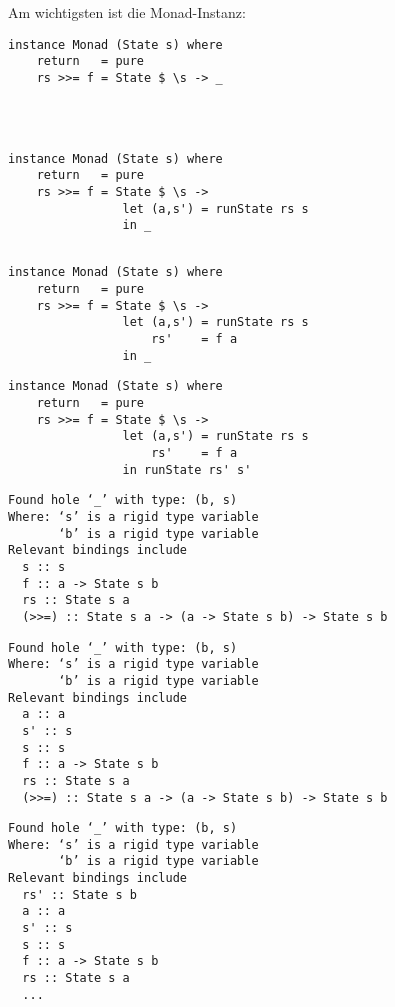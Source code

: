 \documentclass{beamer}
\begin{document}
\begin{frame}[fragile]
Am wichtigsten ist die Monad-Instanz:
\begin{overprint}
\begin{verbatim}
instance Monad (State s) where
    return   = pure
    rs >>= f = State $ \s -> _

    
    
\end{verbatim}
\begin{verbatim}
instance Monad (State s) where
    return   = pure
    rs >>= f = State $ \s ->
                let (a,s') = runState rs s
                in _
    
\end{verbatim}
\begin{verbatim}
instance Monad (State s) where
    return   = pure
    rs >>= f = State $ \s ->
                let (a,s') = runState rs s
                    rs'    = f a
                in _
\end{verbatim}
\begin{verbatim}
instance Monad (State s) where
    return   = pure
    rs >>= f = State $ \s ->
                let (a,s') = runState rs s
                    rs'    = f a
                in runState rs' s'
\end{verbatim}
\end{overprint}
\bigskip
\scriptsize
\begin{overprint}
\begin{verbatim}
Found hole ‘_’ with type: (b, s)
Where: ‘s’ is a rigid type variable
       ‘b’ is a rigid type variable
Relevant bindings include
  s :: s
  f :: a -> State s b
  rs :: State s a
  (>>=) :: State s a -> (a -> State s b) -> State s b
\end{verbatim}
\begin{verbatim}
Found hole ‘_’ with type: (b, s)
Where: ‘s’ is a rigid type variable
       ‘b’ is a rigid type variable
Relevant bindings include
  a :: a
  s' :: s
  s :: s
  f :: a -> State s b
  rs :: State s a
  (>>=) :: State s a -> (a -> State s b) -> State s b
\end{verbatim}
\begin{verbatim}
Found hole ‘_’ with type: (b, s)
Where: ‘s’ is a rigid type variable
       ‘b’ is a rigid type variable
Relevant bindings include
  rs' :: State s b
  a :: a
  s' :: s
  s :: s
  f :: a -> State s b
  rs :: State s a
  ...
\end{verbatim}
\end{overprint}
\end{frame}
\end{document}
